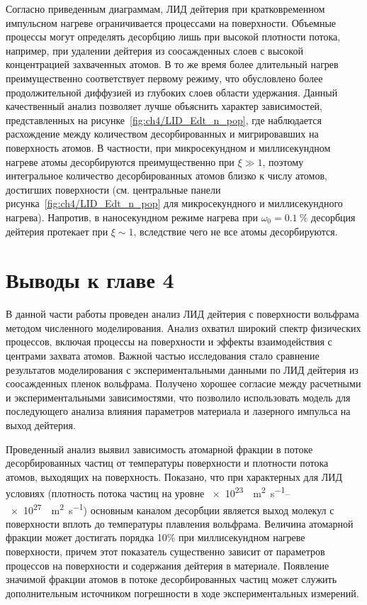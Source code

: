 Согласно приведенным диаграммам, ЛИД дейтерия при кратковременном импульсном нагреве ограничивается процессами на поверхности. Объемные процессы могут определять десорбцию лишь при высокой плотности потока, например, при удалении дейтерия из соосажденных слоев с высокой концентрацией захваченных атомов. В то же время более длительный нагрев преимущественно соответствует первому режиму, что обусловлено более продолжительной диффузией из глубоких слоев области удержания. Данный качественный анализ позволяет лучше объяснить характер зависимостей, представленных на рисунке~\cref{fig:ch4/LID_Edt_n_pop}, где наблюдается расхождение между количеством десорбированных и мигрировавших на поверхность атомов. В частности, при микросекундном и миллисекундном нагреве атомы десорбируются преимущественно при \(\xi \gg 1\), поэтому интегральное количество десорбированных атомов близко к числу атомов, достигших поверхности (см. центральные панели рисунка~\cref{fig:ch4/LID_Edt_n_pop} для микросекундного и миллисекундного нагрева). Напротив, в наносекундном режиме нагрева при \( \omega_0=\SI{0.1}{\percent} \) десорбция дейтерия протекает при \(\xi \sim 1 \), вследствие чего не все атомы десорбируются.

\section{Выводы к главе 4}

В данной части работы проведен анализ ЛИД дейтерия с поверхности вольфрама методом численного моделирования. Анализ охватил широкий спектр физических процессов, включая процессы на поверхности и эффекты взаимодействия с центрами захвата атомов. Важной частью исследования стало сравнение результатов моделирования с экспериментальными данными по ЛИД дейтерия из соосажденных пленок вольфрама. Получено хорошее согласие между расчетными и экспериментальными зависимостями, что позволило использовать модель для последующего анализа влияния параметров материала и лазерного импульса на выход дейтерия.

Проведенный анализ выявил зависимость атомарной фракции в потоке десорбированных частиц от температуры поверхности и плотности потока атомов, выходящих на поверхность. Показано, что при характерных для ЛИД условиях (плотность потока частиц на уровне \SIrange{e23}{e27}{\per\meter\squared\per\second}) основным каналом десорбции является выход молекул с поверхности вплоть до температуры плавления вольфрама. Величина атомарной фракции может достигать порядка 10\% при миллисекундном нагреве поверхности, причем этот показатель существенно зависит от параметров процессов на поверхности и содержания дейтерия в материале. Появление значимой фракции атомов в потоке десорбированных частиц может служить дополнительным источником погрешности в ходе экспериментальных измерений.

